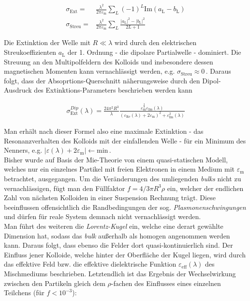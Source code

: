 \documentclass[numbers=noenddot,a4paper,notitlepage,twoside,BCOR15mm]{scrartcl}
\newcommand{\tenpo}[1]{ 10^{#1}}
\newcommand{\ix}[1]{_\text{#1}}
\newcommand{\tilt}[1]{\textit{#1}}
\begin{document}
				\begin{align}
					\sigma\ix{Ext}=&\frac{\lambda^2}{2\pi\varepsilon\ix{m}}\sum_{L}\left(-1\right)^{L}\text{Im}\left(a\ix{L}-b\ix{L}\right)\\
					\sigma\ix{Streu}=&\frac{\lambda^2}{2\pi\varepsilon\ix{m}}\sum_{L}\frac{|a\ix{L}|^2-|b\ix{L}|^2}{2L+1}
				\end{align}

			Die Extinktion der Welle mit $R\ll\lambda$ wird durch den elektrischen Streukoeffizienten $a\ix{L}$ der 1. Ordnung - die dipolare Partialwelle - dominiert. Die Streuung an den Multipolfeldern des Kolloids und insbesondere dessen magnetischen Momenten kann vernachlässigt werden, e.g. $\sigma\ix{Streu}\approx0$\,. Daraus folgt, dass der Absoprtions-Querschnitt näherungsweise durch den Dipol-Ausdruck des Extinktions-Parameters beschrieben werden kann

				\begin{align}
					\sigma\ix{Ext}^{Dip}\left(\lambda\right)=\frac{24\pi^2 R^3}{\lambda}\frac{\varepsilon\ix{m}^{\frac{3}{2}}\varepsilon\ix{Im}\left(\lambda\right)}{\left(\varepsilon\ix{Re}\left(\lambda\right)+2\varepsilon\ix{m}\right)^2+\varepsilon\ix{Im}^{2}\left(\lambda\right)}
				\end{align}

			Man erhält nach dieser Formel also eine maximale Extinktion - das Resonanzverhalten des Kolloids mit der einfallenden Welle - für ein Minimum des Nenners, e.g. $|\varepsilon\left(\lambda\right)+2\varepsilon\ix{m}|\leftarrow\text{min}$\,.\\
			Bisher wurde auf Basis der Mie-Theorie von einem quasi-statischen Modell, welches nur ein einzelnes Partikel mit freien Elektronen in einem Medium mit $\varepsilon\ix{m}$ betrachtet, ausgegangen. Um die Veränderungen des umliegenden \tilt{bulks} nicht zu vernachlässigen, fügt man den Füllfaktor $f=4/3\pi R^3\rho$ ein, welcher der endlichen Zahl von nächsten Kolloiden in einer Suspension Rechnung trägt. Diese beeinflussen offensichtlich die Randbedingungen der sog. \tilt{Plasmonenschwingungen} und dürfen für reale System demnach nicht vernachlässigt werden.\\
			Man führt des weiteren die \tilt{Lorentz-Kugel} ein, welche eine derart gewählte Dimension hat, sodass das \tilt{bulk} außerhalb als homogen angenommen werden kann. Daraus folgt, dass ebenso die Felder dort quasi-kontinuierlich sind. Der Einfluss jener Kolloide, welche hinter der Oberfläche der Kugel liegen, wird durch das effektive Feld bzw. die effektive dielektrische Funktion $\varepsilon\ix{eff}\left(\lambda\right)$ des Mischmediums beschrieben. Letztendlich ist das Ergebnis der Wechselwirkung zwischen den Partikeln gleich dem $\rho$-fachen des Einflusses eines einzelnen Teilchens (für $f<\tenpo{-3}$):
\end{document}
